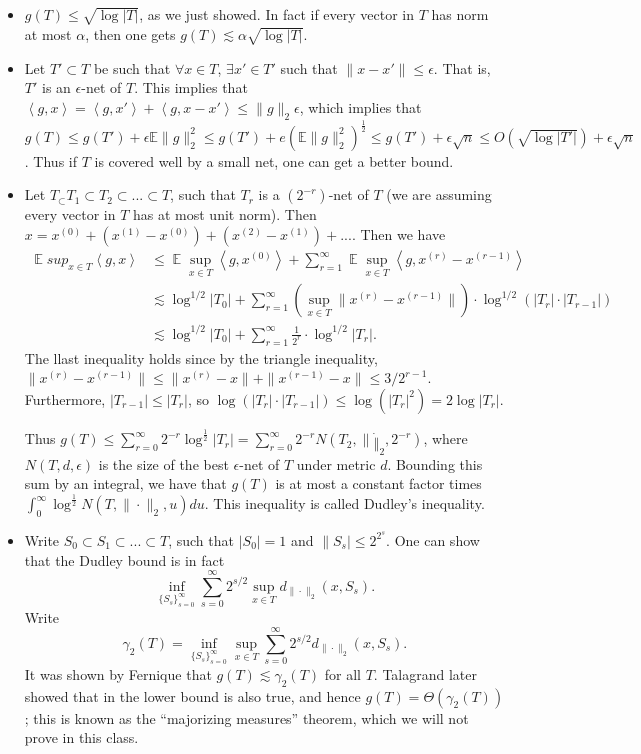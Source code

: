 \documentclass[11pt]{article}
\DeclareMathOperator*{\E}{\mathbb{E}}
\newcommand{\inprod}[1]{\left\langle #1 \right\rangle}
\begin{document}
\begin{itemize}

\item $g(T) \leq \sqrt{\log|T|}$, as we just showed. In fact if every vector in $T$ has norm at most $\alpha$, then one gets $g(T) \lesssim \alpha\sqrt{\log |T|}$.
\item Let $T' \subset T$ be such that $\forall x \in T$, $\exists x' \in T'$ such that $\|x-x'\| \leq \epsilon$. That is, $T'$ is an $\epsilon$-net of $T$. This implies that $\inprod{g,x} = \inprod{g,x'} + \inprod{g,x-x'} \leq \|g\|_2 \epsilon$, which implies that $g(T) \leq g(T') + \epsilon \mathbb{E} \|g\|_2^2 \leq g(T') + e ( \mathbb{E} \|g\|_2^2)^ {\frac{1}{2}} \leq g(T') + \epsilon\sqrt{n} \leq O(\sqrt{\log|T'|}) + \epsilon\sqrt{n}$. Thus if $T$ is covered well by a small net, one can get a better bound.
\item  Let $T_ \subset T_1 \subset T_2 \subset ... \subset T$, such that $T_r$ is a $(2^{-r})$-net of $T$ (we are assuming every vector in $T$ has at most unit norm). Then $x = x^{(0)} + (x^{(1)} - x^{(0)} ) + (x^{(2)} - x^{(1)}) +... $. Then we have 
\begin{align*}
\E sup_{x\in T} \inprod{g,x} &\le \E \sup_{x\in T}\inprod{g, x^{(0)}}  + \sum_{r=1}^\infty \E \sup_{x\in T}\inprod{g, x^{(r)} - x^{(r-1)}}\\
{}&\lesssim \log^{1/2} |T_0| + \sum_{r=1}^\infty (\sup_{x\in T} \|x^{(r)} - x^{(r-1)}\|)\cdot \log^{1/2}(|T_r|\cdot |T_{r-1}|)\\
{}&\lesssim \log^{1/2} |T_0| + \sum_{r=1}^\infty \frac 1{2^r}\cdot \log^{1/2}|T_r| .
\end{align*}
The llast inequality holds since by the triangle inequality, $\|x^{(r)} - x^{(r-1)}\| \le \|x^{(r)} - x\| + \|x^{(r-1)} - x\| \le 3/2^{r-1}$. Furthermore, $|T_{r-1}| \le |T_r|$, so $\log(|T_r|\cdot |T_{r-1}|) \le \log(|T_r|^2) = 2\log|T_r|$.

Thus $g(T) \leq \sum_{r=0}^{\infty} 2^{-r} \log^{\frac{1}{2}}|T_r| = \sum_{r=0}^{\infty} 2^{-r} N(T_2,\| \dot \|_2, 2^{-r})$, where $N(T,d,\epsilon)$ is the size of the best $\epsilon$-net of $T$ under metric $d$. Bounding this sum by an integral, we have that $g(T)$ is at most a constant factor times $\int_{0}^{\infty} \log^{\frac{1}{2}} N(T,\| \cdot \|_2,u) du$. This inequality is called Dudley's inequality.

\item Write $S_0 \subset S_1 \subset ... \subset T$, such that $|S_0| =1$ and $\|S_s| \leq 2^{2^s}$. One can show that the Dudley bound is in fact 
$$
\inf_{ \{S_s \}_{s=0}^{\infty} } \sum_{s=0}^{\infty} 2^{s/2} \sup_{x \in T} d_{ \| \cdot \|_2 } (x,S_s) .
$$
Write 
$$
\gamma_2(T) = \inf_{ \{S_s \}_{s=0}^{\infty} } \sup_{x \in T} \sum_{s=0}^{\infty} 2^{s/2}  d_{ \| \cdot \|_2 } (x,S_s) .
$$
It was shown by Fernique \cite{Fernique} that $g(T) \lesssim \gamma_2(T)$ for all $T$. Talagrand later showed that in \cite{Talagrand} the lower bound is also true, and hence $g(T) = \Theta(\gamma_2(T))$; this is known as the ``majorizing measures'' theorem, which we will not prove in this class.
\end{itemize}
 
\end{document}
